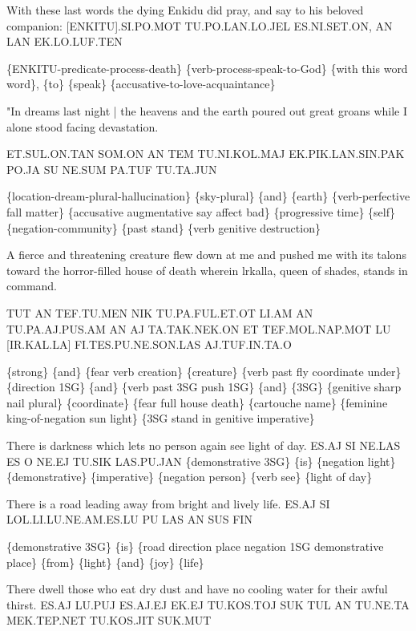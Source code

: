 {With these last words the dying Enkidu did pray, and say to his beloved companion:  
 [ENKITU].SI.PO.MOT TU.PO.LAN.LO.JEL ES.NI.SET.ON, AN LAN EK.LO.LUF.TEN 

\{ENKITU-predicate-process-death\} \{verb-process-speak-to-God\} \{with this word word\}, \{to\} \{speak\} \{accusative-to-love-acquaintance\} 

 
 

"In dreams last night | the heavens and the earth poured out great groans while I alone stood facing devastation.  

ET.SUL.ON.TAN SOM.ON AN TEM TU.NI.KOL.MAJ EK.PIK.LAN.SIN.PAK PO.JA SU NE.SUM PA.TUF TU.TA.JUN 

\{location-dream-plural-hallucination\} \{sky-plural\} \{and\} \{earth\} \{verb-perfective fall matter\} \{accusative augmentative say affect bad\} \{progressive time\} \{self\} \{negation-community\} \{past stand\} \{verb genitive destruction\} 

 
 

A fierce and threatening creature flew down at me and pushed me with its talons toward the horror-filled house of death wherein lrkalla, queen of shades, stands in command.  

TUT AN TEF.TU.MEN NIK TU.PA.FUL.ET.OT LI.AM AN TU.PA.AJ.PUS.AM AN AJ TA.TAK.NEK.ON ET TEF.MOL.NAP.MOT LU [IR.KAL.LA] FI.TES.PU.NE.SON.LAS AJ.TUF.IN.TA.O 

\{strong\} \{and\} \{fear verb creation\} \{creature\} \{verb past fly coordinate under\} \{direction 1SG\} \{and\} \{verb past 3SG push 1SG\} \{and\} \{3SG\} \{genitive sharp nail plural\} \{coordinate\} \{fear full house death\} \{cartouche name\} \{feminine king-of-negation sun light\} \{3SG stand in genitive imperative\} 

 
 

There is darkness which lets no person again see light of day.  
 ES.AJ SI NE.LAS ES O NE.EJ TU.SIK LAS.PU.JAN 
 \{demonstrative 3SG\} \{is\} \{negation light\} \{demonstrative\} \{imperative\} \{negation person\} \{verb see\} \{light of day\} 

 
 

There is a road leading away from bright and lively life.  
 ES.AJ SI LOL.LI.LU.NE.AM.ES.LU PU LAS AN SUS FIN 

\{demonstrative 3SG\} \{is\} \{road direction place negation 1SG demonstrative place\} \{from\} \{light\} \{and\} \{joy\} \{life\} 

 
 

There dwell those who eat dry dust and have no cooling water for their awful thirst.  
 ES.AJ LU.PUJ ES.AJ.EJ EK.EJ TU.KOS.TOJ SUK TUL AN TU.NE.TA MEK.TEP.NET TU.KOS.JIT SUK.MUT 

}
